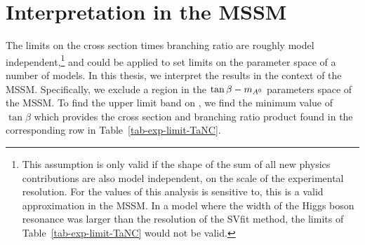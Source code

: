 
\section{Interpretation in the MSSM}
\label{sec:MSSMInterp}
%
The limits on the cross section times branching ratio are roughly model
independent,\footnote{This assumption is only valid if the shape of the sum of
all new physics contributions are also model independent, on the scale of the
experimental resolution.  For the values of \tb this analysis is sensitive to,
this is a valid approximation in the MSSM\@.  In a model where the width of the
Higgs boson resonance was larger than the resolution of the SVfit method, the
limits of Table~\ref{tab-exp-limit-TaNC} would not be valid.} and could be
applied to set limits on the parameter space of a number of models.  In this
thesis, we interpret the results in the context of the MSSM\@.  Specifically, we
exclude a region in the $\mbox{\ensuremath{\tan\beta}} - m_{A^0}$ parameters space of the MSSM\@.  To find the
upper limit band on \tb, we find the minimum value of $\tan\beta$ which provides
the cross section and branching ratio product found in the corresponding row in
Table~\ref{tab-exp-limit-TaNC}. 

